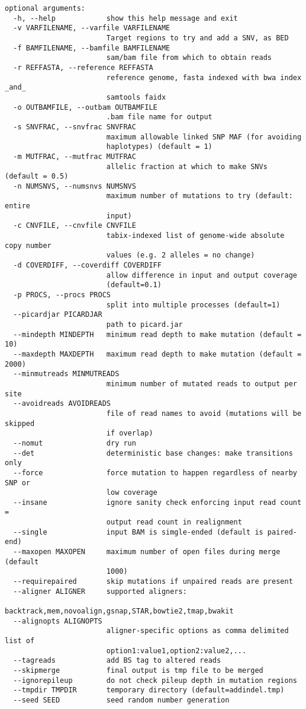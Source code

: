 \documentclass[letterpaper,11pt]{article}
\begin{document}
\begin{verbatim}
optional arguments:
  -h, --help            show this help message and exit
  -v VARFILENAME, --varfile VARFILENAME
                        Target regions to try and add a SNV, as BED
  -f BAMFILENAME, --bamfile BAMFILENAME
                        sam/bam file from which to obtain reads
  -r REFFASTA, --reference REFFASTA
                        reference genome, fasta indexed with bwa index _and_
                        samtools faidx
  -o OUTBAMFILE, --outbam OUTBAMFILE
                        .bam file name for output
  -s SNVFRAC, --snvfrac SNVFRAC
                        maximum allowable linked SNP MAF (for avoiding
                        haplotypes) (default = 1)
  -m MUTFRAC, --mutfrac MUTFRAC
                        allelic fraction at which to make SNVs (default = 0.5)
  -n NUMSNVS, --numsnvs NUMSNVS
                        maximum number of mutations to try (default: entire
                        input)
  -c CNVFILE, --cnvfile CNVFILE
                        tabix-indexed list of genome-wide absolute copy number
                        values (e.g. 2 alleles = no change)
  -d COVERDIFF, --coverdiff COVERDIFF
                        allow difference in input and output coverage
                        (default=0.1)
  -p PROCS, --procs PROCS
                        split into multiple processes (default=1)
  --picardjar PICARDJAR
                        path to picard.jar
  --mindepth MINDEPTH   minimum read depth to make mutation (default = 10)
  --maxdepth MAXDEPTH   maximum read depth to make mutation (default = 2000)
  --minmutreads MINMUTREADS
                        minimum number of mutated reads to output per site
  --avoidreads AVOIDREADS
                        file of read names to avoid (mutations will be skipped
                        if overlap)
  --nomut               dry run
  --det                 deterministic base changes: make transitions only
  --force               force mutation to happen regardless of nearby SNP or
                        low coverage
  --insane              ignore sanity check enforcing input read count =
                        output read count in realignment
  --single              input BAM is simgle-ended (default is paired-end)
  --maxopen MAXOPEN     maximum number of open files during merge (default
                        1000)
  --requirepaired       skip mutations if unpaired reads are present
  --aligner ALIGNER     supported aligners:
                        backtrack,mem,novoalign,gsnap,STAR,bowtie2,tmap,bwakit
  --alignopts ALIGNOPTS
                        aligner-specific options as comma delimited list of
                        option1:value1,option2:value2,...
  --tagreads            add BS tag to altered reads
  --skipmerge           final output is tmp file to be merged
  --ignorepileup        do not check pileup depth in mutation regions
  --tmpdir TMPDIR       temporary directory (default=addindel.tmp)
  --seed SEED           seed random number generation
\end{verbatim}
\end{document}
